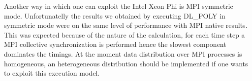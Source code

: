 \par{Another way in which one can exploit the Intel Xeon Phi is MPI symmetric mode. Unfortunatelly the results we obtained by 
executing DL\_POLY in symmetric mode were on the same level of performance with MPI native results. This was expected because of 
the nature of the calculation, for each time step a MPI collective synchronization is performed hence the slowest component 
dominates the timings. At the moment data distribution over MPI processes is homogeneous, an heterogeneous distribution should be 
implemented if one wants to exploit this execution model.}
